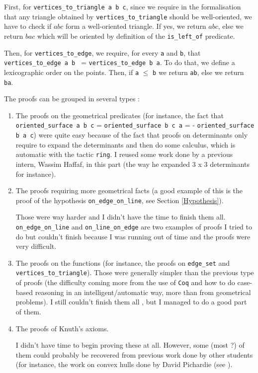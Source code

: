 \documentclass[a4paper,10pt]{article}
\begin{document}
\begin{itemize}
  First, for {\tt vertices\_to\_triangle a b c}, since we require in the formalisation that any triangle obtained by {\tt vertices\_to\_triangle} should be well-oriented, we have to check if $abc$ form a well-oriented triangle. If yes, we return $abc$, else we return $bac$ which will be oriented by definition of the {\tt is\_left\_of} predicate.

  Then, for {\tt vertices\_to\_edge}, we require, for every {\tt a} and {\tt b}, that {\tt vertices\_to\_edge a b } = {\tt vertices\_to\_edge b a}. To do that, we define a lexicographic order on the points. Then, if {\tt a} $\leq$ {\tt b} we return {\tt ab}, else we return {\tt ba}.
\end{itemize}
The proofs can be grouped in several types :
\begin{enumerate}
\item The proofs on the geometrical predicates (for instance, the fact that {\tt oriented\_surface a b c} = {\tt oriented\_surface b c a} = {- \tt oriented\_surface b a c}) were quite easy because of the fact that proofs on determinants only require to expand the determinants and then do some calculus, which is automatic with the tactic {\tt ring}. I reused some work done by a previous intern, Wassim Haffaf, in this part (the way he expanded 3 x 3 determinants for instance).
\item The proofs requiring more geometrical facts (a good example of this is the proof of the hypothesis {\tt on\_edge\_on\_line}, see Section \ref{Hypothesis}).

  Those were way harder and I didn't have the time to finish them all. {\tt on\_edge\_on\_line} and {\tt on\_line\_on\_edge} are two examples of proofs I tried to do but couldn't finish because I was running out of time and the proofs were very difficult.
  \item The proofs on the functions (for instance, the proofs on {\tt edge\_set} and {\tt vertices\_to\_triangle}). Those were generally simpler than the previous type of proofs (the difficulty coming more from the use of {\tt Coq} and how to do case-based reasoning in an intelligent/automatic way, more than from geometrical problems). I still couldn't finish them all , but I managed to do a good part of them. 

  \item The proofs of Knuth's axioms.

    I didn't have time to begin proving these at all. However, some (most ?) of them could probably be recovered from previous work done by other students (for instance, the work on convex hulls done by David Pichardie (see \cite{Hull}).
  \end{enumerate}
\end{document}
